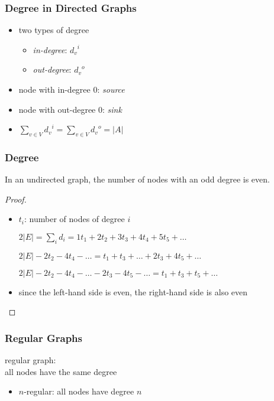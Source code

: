 \documentclass[dvipsnames]{beamer}
\begin{document}
\begin{frame}
  \frametitle{Degree in Directed Graphs}

  \begin{itemize}
    \item two types of degree
    \begin{itemize}
      \item \emph{in-degree}: ${d_v}^i$
      \item \emph{out-degree}: ${d_v}^o$
    \end{itemize}

    \pause
    \medskip
    \item node with in-degree 0: \emph{source}
    \item node with out-degree  0: \emph{sink}

    \pause
    \item $\sum_{v \in V} {d_v}^i = \sum_{v \in V} {d_v}^o = |A|$
  \end{itemize}
\end{frame}

\begin{frame}
  \frametitle{Degree}

  \begin{theorem}
    In an undirected graph, the number of nodes with an odd degree is even.
  \end{theorem}

  \pause
  \begin{proof}
    \begin{itemize}
      \item $t_i$: number of nodes of degree $i$

      \pause
$2|E| = \sum_i d_i = 1t_1 + 2t_2 + 3t_3 + 4t_4 + 5t_5 + \dots$

\pause
$2|E| - 2t_2 - 4t_4 - \dots = t_1 + t_3 + \dots + 2t_3 + 4t_5 + \dots$

\pause
$2|E| - 2t_2 - 4t_4 - \dots - 2t_3 - 4t_5 - \dots = t_1 + t_3 + t_5 + \dots$

      \pause
      \item since the left-hand side is even, the right-hand side is also even
    \end{itemize}
  \end{proof}
\end{frame}

\begin{frame}
  \frametitle{Regular Graphs}

  \begin{definition}
    \alert{regular graph}:\\
    all nodes have the same degree

    \begin{itemize}
      \item $n$-regular: all nodes have degree $n$
    \end{itemize}
  \end{definition}
\end{frame}
\end{document}
